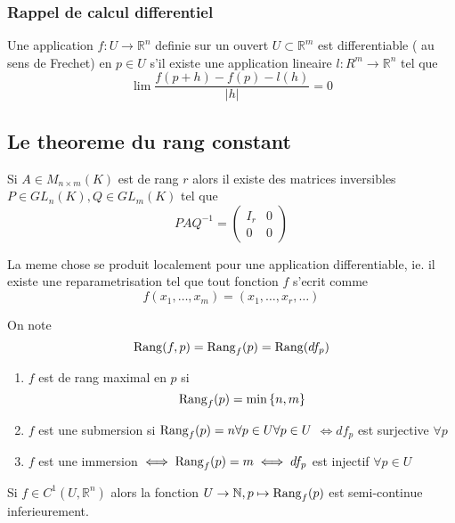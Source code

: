 \documentclass[../main.tex]{subfiles}
\begin{document}
\subsubsection{Rappel de calcul differentiel}
\begin{defn}
	Une application $f: U \to \mathbb{R}^n$ definie sur un ouvert $U \subset \mathbb{R}^m$ est differentiable ( au sens de Frechet) en $p \in U$ s'il existe une application lineaire $l : R^{m}\to \mathbb{R}^n$ tel que
	\[ 
		\lim \frac{f( p+h) - f( p) - l( h) }{ |h|}=0
	\]
	
\end{defn}
\subsection{Le theoreme du rang constant}
Si $A \in M_{n\times m} ( K)$ est de rang $r$ alors il existe des matrices inversibles $P\in GL_n( K) , Q\in GL_m( K) $ tel que
\[ 
PAQ^{-1} = \begin{pmatrix}
	I_r & 0\\
	0 & 0
\end{pmatrix} 
\]
\begin{thm}
	La meme chose se produit localement pour une application differentiable, ie. il existe une reparametrisation tel que tout fonction $f$ s'ecrit comme 
	\[ 
		f( x_1,\ldots, x_m) = ( x_1,\ldots, x_r, \ldots) 
	\]
	
\end{thm}
\begin{defn}
On note 
\[ 
	\operatorname{Rang}( f,p) = \operatorname{Rang}_f( p) = \operatorname{Rang} ( df_p) 
\]

\end{defn}
\begin{defn}
	\begin{enumerate}
	\item 
	$f$ est de rang maximal en $p$ si
	\[ 
		\operatorname{Rang}_f( p) = \min \left\{ n,m \right\} 
	\]
\item $f$ est une submersion si $\operatorname{Rang}_f( p) =n \forall p \in U\forall p \in U$ $\iff df_p $ est surjective $\forall p$ 
\item $f$ est une immersion $\iff \operatorname{Rang}_f( p) =m \iff df_p$ est injectif $\forall p \in U$ 
	\end{enumerate}
	
\end{defn}
\begin{lemma}
	Si $f\in C^{1}( U, \mathbb{R}^n) $ alors la fonction $U\to \mathbb{N}, p\mapsto \operatorname{Rang}_f( p) $ est semi-continue inferieurement.
\end{lemma}
\end{document}
